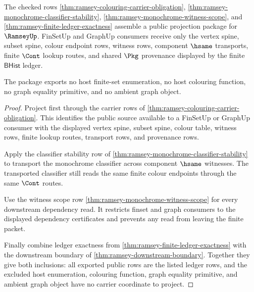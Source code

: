 \begin{theorem}
\label{thm:ramsey-public-projection-package}
The checked rows
\autoref{thm:ramsey-colouring-carrier-obligation},
\autoref{thm:ramsey-monochrome-classifier-stability},
\autoref{thm:ramsey-monochrome-witness-scope}, and
\autoref{thm:ramsey-finite-ledger-exactness} assemble a public projection
package for $\RamseyUp$. FinSetUp and GraphUp consumers receive only the
vertex spine, subset spine, colour endpoint rows, witness rows, component
$\hsame$ transports, finite $\Cont$ lookup routes, and shared $\Pkg$
provenance displayed by the finite $\mathsf{BHist}$ ledger.

The package exports no host finite-set enumeration, no host colouring
function, no graph equality primitive, and no ambient graph object.
\end{theorem}
\begin{proof}
Project first through the carrier rows of
\autoref{thm:ramsey-colouring-carrier-obligation}. This identifies the public
source available to a FinSetUp or GraphUp consumer with the displayed vertex
spine, subset spine, colour table, witness rows, finite lookup routes,
transport rows, and provenance rows.

Apply the classifier stability row of
\autoref{thm:ramsey-monochrome-classifier-stability} to transport the
monochrome classifier across component $\hsame$ witnesses. The transported
classifier still reads the same finite colour endpoints through the same
$\Cont$ routes.

Use the witness scope row
\autoref{thm:ramsey-monochrome-witness-scope} for every downstream dependency
read. It restricts finset and graph consumers to the displayed dependency
certificates and prevents any read from leaving the finite packet.

Finally combine ledger exactness from
\autoref{thm:ramsey-finite-ledger-exactness} with the downstream boundary of
\autoref{thm:ramsey-downstream-boundary}. Together they give both inclusions:
all exported public rows are the listed ledger rows, and the excluded host
enumeration, colouring function, graph equality primitive, and ambient graph
object have no carrier coordinate to project.
\end{proof}

